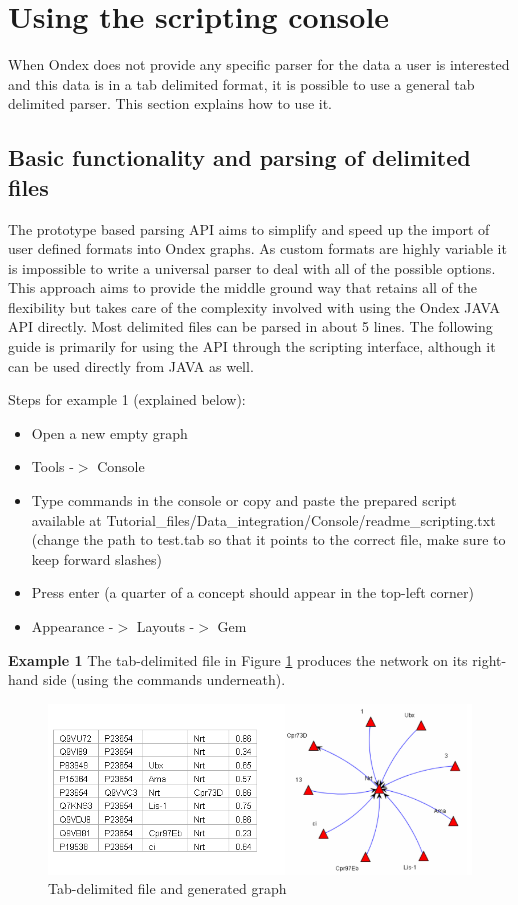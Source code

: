 



\section{Using the scripting console}
\label{sec:parsing_tabdel}
When Ondex does not provide any specific parser for the data a user is interested and this data is in a tab delimited format, 
it is possible to use a general tab delimited parser. This section explains how to use it.

\subsection{Basic functionality and parsing of delimited files}
The prototype based parsing API aims to simplify and speed up the import of user defined formats into Ondex graphs. 
As custom formats are highly variable it is impossible to write a universal parser to deal with all of the possible options. 
This approach aims to provide the middle ground way that retains all of the flexibility but takes care of the complexity involved 
with using the Ondex JAVA API directly. Most delimited files can be parsed in about 5 lines. 
The following guide is primarily for using the API through the scripting interface, although it can be used directly from JAVA as well.

Steps for example 1 (explained below):
\begin{itemize}
\item Open a new empty graph
\item Tools -$>$ Console
\item Type commands in the console or copy and paste the prepared script available at Tutorial\_files/Data\_integration/Console/readme\_scripting.txt
(change the path to test.tab so that it points to the correct file, make sure to keep forward slashes)
\item Press enter (a quarter of a concept should appear in the top-left corner)
\item Appearance -$>$ Layouts -$>$ Gem
\end{itemize}

\textbf{Example 1}
The tab-delimited file in Figure \ref{fig:tab_and_graph} produces the network on its right-hand side (using the commands underneath).
\begin{figure}[h]
\centering
\includegraphics[scale=0.5]{images/Oct12/tab_and_graph.png} 
\caption{Tab-delimited file and generated graph}
\label{fig:tab_and_graph}
\end{figure}


